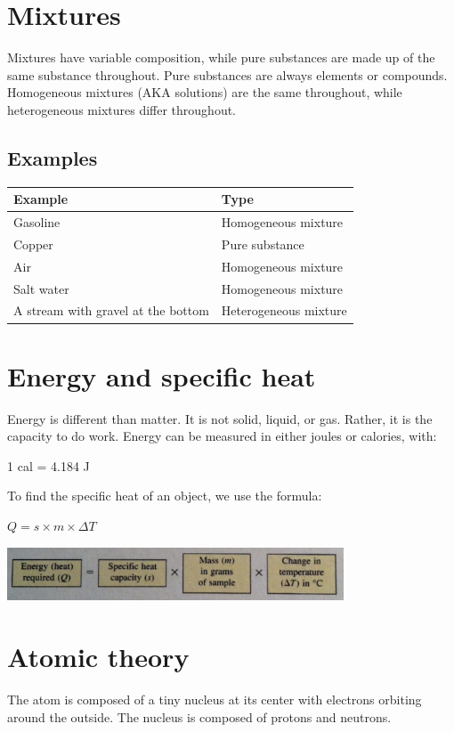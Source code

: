 \documentclass[]{article}
\begin{document}
\section{Mixtures}
Mixtures have variable composition, while pure substances are made up of the same substance throughout. Pure substances are always elements or compounds. Homogeneous mixtures (AKA solutions) are the same throughout, while heterogeneous mixtures differ throughout.

\subsection{Examples}
\vspace{5mm}
\begin{tabular}{ | l | l |}
    \hline
    Example & Type \\ \hline
    Gasoline & Homogeneous mixture \\ \hline 
    Copper & Pure substance \\ \hline
    Air & Homogeneous mixture \\ \hline
    Salt water & Homogeneous mixture \\ \hline
    A stream with gravel at the bottom & Heterogeneous mixture \\ \hline
\end{tabular}

\section{Energy and specific heat}
Energy is different than matter. It is not solid, liquid, or gas. Rather, it is the capacity to do work. Energy can be measured in either joules or calories, with:

1 cal = 4.184 J

To find the specific heat of an object, we use the formula:

$Q = s \times m \times \Delta{T}$

\vspace{5mm}
\includegraphics[width=10cm]{specific_heat.jpg}

\section{Atomic theory}
The atom is composed of a tiny nucleus at its center with electrons orbiting around the outside. The nucleus is composed of protons and neutrons.
\end{document}
